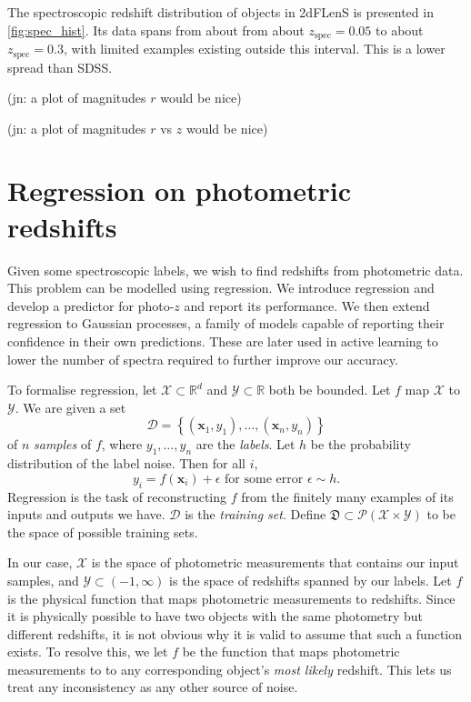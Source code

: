 \documentclass[11pt,twoside,openright]{report}
\newcommand\bbR{\mathbb{R}}
\newcommand\bx{\mathbf{x}}
\newcommand\cD{\mathcal{D}}
\newcommand\cP{\mathcal{P}}
\newcommand\cX{\mathcal{X}}
\newcommand\cY{\mathcal{Y}}
\newcommand\fD{\mathfrak{D}}
\newcommand\jn[1]{{\color{red}(jn: #1)}}
\begin{document}
  The spectroscopic redshift distribution of objects in 2dFLenS is presented in \cref{fig:spec_hist}. Its data spans from about from about $z_\mathrm{spec} = 0.05$ to about $z_\mathrm{spec} = 0.3$, with limited examples existing outside this interval. This is a lower spread than SDSS.

  \jn{a plot of magnitudes $r$ would be nice}

  \jn{a plot of magnitudes $r$ vs $z$ would be nice}

\chapter{Regression on photometric redshifts}

Given some spectroscopic labels, we wish to find redshifts from photometric data. This problem can be modelled using regression. We introduce regression and develop a predictor for photo-$z$ and report its performance. We then extend regression to Gaussian processes, a family of models capable of reporting their confidence in their own predictions. These are later used in active learning to lower the number of spectra required to further improve our accuracy.

To formalise regression, let $\cX \subset \bbR^d$ and $\cY \subset \bbR$ both be bounded. Let $f$ map $\cX$ to $\cY$. We are given a set \[
  \cD = \left\{\left(\bx_1, y_1\right), \dots, \left(\bx_n, y_n\right)\right\}
\] of $n$ \emph{samples} of $f$, where $y_1, \dots, y_n$ are the \emph{labels}. Let $h$ be the probability distribution of the label noise. Then for all $i$, \[
  y_i = f(\bx_i) + \epsilon \text{ for some error } \epsilon \sim h \text{.}
\] Regression is the task of reconstructing $f$ from the finitely many examples of its inputs and outputs we have. $\cD$ is the \emph{training set}. Define $\fD \subset \cP(\cX \times \cY)$ to be the space of possible training sets.

In our case, $\cX$ is the space of photometric measurements that contains our input samples, and $\cY \subset (-1, \infty)$ is the space of redshifts spanned by our labels. Let $f$ is the physical function that maps photometric measurements to redshifts. Since it is physically possible to have two objects with the same photometry but different redshifts, it is not obvious why it is valid to assume that such a function exists. To resolve this, we let $f$ be the function that maps photometric measurements to to any corresponding object's \emph{most likely} redshift. This lets us treat any inconsistency as any other source of noise.
\end{document}
